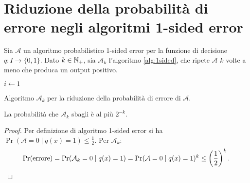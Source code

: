 %
%
%
%


\section{Riduzione della probabilità di errore negli algoritmi 1-sided error}
\newcommand{\Aalg}{\mathcal A}

Sia $\Aalg$ un algoritmo probabilistico 1-sided error per la funzione di decisione $q:I\to\{0,1\}$.
Dato $k\in\mathbb N_+$, sia $\Aalg_k$ l'algoritmo \ref{alg:1sided}, che ripete $\Aalg$ $k$ volte a meno che produca un output positivo.

\begin{algorithm}
	\DontPrintSemicolon

	$i\leftarrow1$ \;
	\While{$\Out=0\land i\le k$}{
		$\Out\asn\Aalg(x)$ \;
		$i\asn i+1$ \;
	}
	\Return{\Out} \;

	\caption{Algoritmo $\Aalg_k$ per la riduzione della probabilità di errore di $\Aalg$.}
	\label{alg:1sided}
\end{algorithm}

\begin{thm}
	La probabilità che $\Aalg_k$ sbagli è al più $2^{-k}$.
\end{thm}
\begin{proof}
	Per definizione di algoritmo 1-sided error si ha $\Pr(\Aalg=0\mid q(x)=1)\le\frac 12$. Per $\Aalg_k$:
	\begin{equation*}
		\Pr(\text{errore}) = \Pr(\Aalg_k=0\mid q(x)=1) = \Pr(\Aalg=0\mid q(x)=1)^k \le \left(\frac{1}{2}\right)^k \text. \qedhere
	\end{equation*}
\end{proof}

